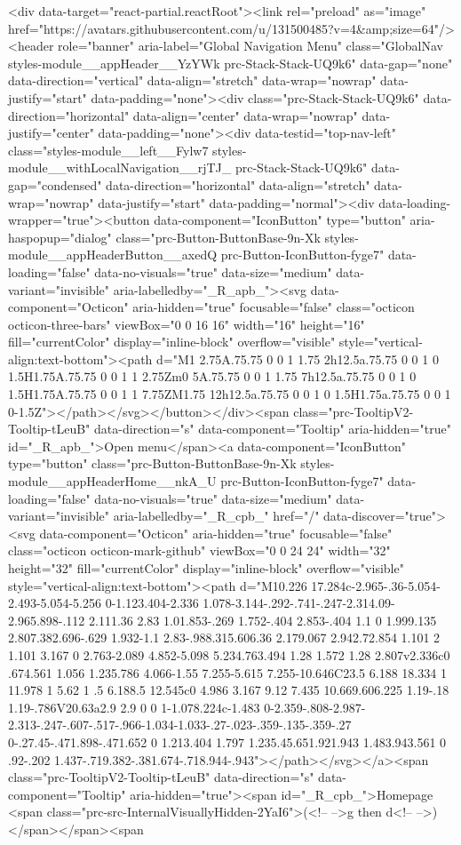   <div data-target="react-partial.reactRoot"><link rel="preload" as="image" href="https://avatars.githubusercontent.com/u/131500485?v=4&amp;size=64"/><header role="banner" aria-label="Global Navigation Menu" class="GlobalNav styles-module__appHeader__YzYWk prc-Stack-Stack-UQ9k6" data-gap="none" data-direction="vertical" data-align="stretch" data-wrap="nowrap" data-justify="start" data-padding="none"><div class="prc-Stack-Stack-UQ9k6" data-direction="horizontal" data-align="center" data-wrap="nowrap" data-justify="center" data-padding="none"><div data-testid="top-nav-left" class="styles-module__left__Fylw7 styles-module__withLocalNavigation__rjTJ_ prc-Stack-Stack-UQ9k6" data-gap="condensed" data-direction="horizontal" data-align="stretch" data-wrap="nowrap" data-justify="start" data-padding="normal"><div data-loading-wrapper="true"><button data-component="IconButton" type="button" aria-haspopup="dialog" class="prc-Button-ButtonBase-9n-Xk styles-module__appHeaderButton__axedQ prc-Button-IconButton-fyge7" data-loading="false" data-no-visuals="true" data-size="medium" data-variant="invisible" aria-labelledby="_R_apb_"><svg data-component="Octicon" aria-hidden="true" focusable="false" class="octicon octicon-three-bars" viewBox="0 0 16 16" width="16" height="16" fill="currentColor" display="inline-block" overflow="visible" style="vertical-align:text-bottom"><path d="M1 2.75A.75.75 0 0 1 1.75 2h12.5a.75.75 0 0 1 0 1.5H1.75A.75.75 0 0 1 1 2.75Zm0 5A.75.75 0 0 1 1.75 7h12.5a.75.75 0 0 1 0 1.5H1.75A.75.75 0 0 1 1 7.75ZM1.75 12h12.5a.75.75 0 0 1 0 1.5H1.75a.75.75 0 0 1 0-1.5Z"></path></svg></button></div><span class="prc-TooltipV2-Tooltip-tLeuB" data-direction="s" data-component="Tooltip" aria-hidden="true" id="_R_apb_">Open menu</span><a data-component="IconButton" type="button" class="prc-Button-ButtonBase-9n-Xk styles-module__appHeaderHome__nkA_U prc-Button-IconButton-fyge7" data-loading="false" data-no-visuals="true" data-size="medium" data-variant="invisible" aria-labelledby="_R_cpb_" href="/" data-discover="true"><svg data-component="Octicon" aria-hidden="true" focusable="false" class="octicon octicon-mark-github" viewBox="0 0 24 24" width="32" height="32" fill="currentColor" display="inline-block" overflow="visible" style="vertical-align:text-bottom"><path d="M10.226 17.284c-2.965-.36-5.054-2.493-5.054-5.256 0-1.123.404-2.336 1.078-3.144-.292-.741-.247-2.314.09-2.965.898-.112 2.111.36 2.83 1.01.853-.269 1.752-.404 2.853-.404 1.1 0 1.999.135 2.807.382.696-.629 1.932-1.1 2.83-.988.315.606.36 2.179.067 2.942.72.854 1.101 2 1.101 3.167 0 2.763-2.089 4.852-5.098 5.234.763.494 1.28 1.572 1.28 2.807v2.336c0 .674.561 1.056 1.235.786 4.066-1.55 7.255-5.615 7.255-10.646C23.5 6.188 18.334 1 11.978 1 5.62 1 .5 6.188.5 12.545c0 4.986 3.167 9.12 7.435 10.669.606.225 1.19-.18 1.19-.786V20.63a2.9 2.9 0 0 1-1.078.224c-1.483 0-2.359-.808-2.987-2.313-.247-.607-.517-.966-1.034-1.033-.27-.023-.359-.135-.359-.27 0-.27.45-.471.898-.471.652 0 1.213.404 1.797 1.235.45.651.921.943 1.483.943.561 0 .92-.202 1.437-.719.382-.381.674-.718.944-.943"></path></svg></a><span class="prc-TooltipV2-Tooltip-tLeuB" data-direction="s" data-component="Tooltip" aria-hidden="true"><span id="_R_cpb_">Homepage <span class="prc-src-InternalVisuallyHidden-2YaI6">(<!-- -->g then d<!-- -->)</span></span><span 